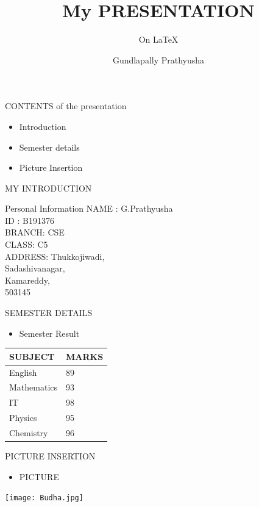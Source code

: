 \documentclass[]{beamer}
\title{My PRESENTATION}
\subtitle{On \LaTeX{}}
\author{Gundlapally Prathyusha}
\institute{RGUKT-B}
\begin{document}
\begin{frame}
    \titlepage
\end{frame}
\begin{frame}{CONTENTS of the presentation}
    \begin{itemize}
        \item Introduction
        \item Semester details
        \item Picture Insertion
    \end{itemize}
\end{frame}
\begin{frame}{MY INTRODUCTION}
\begin{block}{Personal Information}
NAME : G.Prathyusha\\
ID   : B191376\\
BRANCH: CSE\\
CLASS: C5\\
ADDRESS: Thukkojiwadi,\\
\hspace{19mm} Sadashivanagar,\\
\hspace{20mm}Kamareddy,\\
\hspace{20mm}503145
\end{block}


\end{frame}
\begin{frame}{SEMESTER DETAILS}
\centering
 \begin{itemize}
 \centering
     \item Semester Result
     
 \end{itemize}

\begin{tabular}{|K|K|}
\hline
     SUBJECT & MARKS  \\
     \hline
     English & 89 \\ \hline
     Mathematics & 93\\ \hline
     IT  & 98 \\ \hline
    Physics & 95\\ \hline
    Chemistry & 96 \\ \hline
     
     
\end{tabular}
\end{frame}
\begin{frame}{PICTURE INSERTION}
\begin{itemize}
    \item PICTURE 
\end{itemize}
\centering
    \texttt{[image: Budha.jpg]}
\end{frame}
\end{document}
